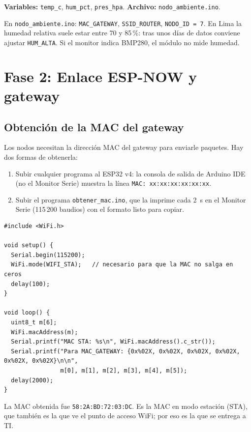 \documentclass[11pt,a4paper]{article}
\newcommand{\arch}[1]{\texttt{#1}}
\begin{document}
\textbf{Variables:} \texttt{temp\_c}, \texttt{hum\_pct}, \texttt{pres\_hpa}.
\textbf{Archivo:} \arch{nodo\_ambiente.ino}.

\begin{completar}
En \arch{nodo\_ambiente.ino}: \texttt{MAC\_GATEWAY}, \texttt{SSID\_ROUTER}, \texttt{NODO\_ID = 7}.
En Lima la humedad relativa suele estar entre 70 y 85\,\%: tras unos d\'ias de datos conviene
ajustar \texttt{HUM\_ALTA}. Si el monitor indica BMP280, el m\'odulo no mide humedad.
\end{completar}

\section{Fase 2: Enlace ESP-NOW y gateway}

\subsection{Obtenci\'on de la MAC del gateway}
\label{sec:mac}

Los nodos necesitan la direcci\'on MAC del gateway para enviarle paquetes. Hay dos formas de
obtenerla:
\begin{enumerate}
  \item Subir cualquier programa al ESP32 v4: la consola de salida de Arduino IDE (no el
        Monitor Serie) muestra la l\'inea \texttt{MAC: xx:xx:xx:xx:xx:xx}.
  \item Subir el programa \arch{obtener\_mac.ino}, que la imprime cada 2~s en el Monitor
        Serie (115\,200 baudios) con el formato listo para copiar.
\end{enumerate}

\begin{lstlisting}[style=cpp, caption={Contenido de \texttt{obtener\_mac.ino}.}]
#include <WiFi.h>

void setup() {
  Serial.begin(115200);
  WiFi.mode(WIFI_STA);   // necesario para que la MAC no salga en ceros
  delay(100);
}

void loop() {
  uint8_t m[6];
  WiFi.macAddress(m);
  Serial.printf("MAC STA: %s\n", WiFi.macAddress().c_str());
  Serial.printf("Para MAC_GATEWAY: {0x%02X, 0x%02X, 0x%02X, 0x%02X, 0x%02X, 0x%02X}\n\n",
                m[0], m[1], m[2], m[3], m[4], m[5]);
  delay(2000);
}
\end{lstlisting}

La MAC obtenida fue \texttt{58:2A:BD:72:03:DC}. Es la MAC en modo estaci\'on (STA), que
tambi\'en es la que ve el punto de acceso WiFi; por eso es la que se entrega a TI.
\end{document}
